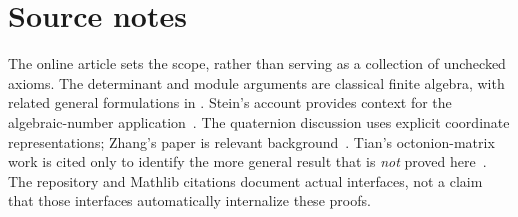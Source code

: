 \documentclass[11pt,letterpaper]{article}
\theoremstyle{remark}
\numberwithin{equation}{section}
\begin{document}
\section*{Source notes}
The online article sets the scope, rather than serving as a collection
of unchecked axioms. The determinant and module arguments are classical
finite algebra, with related general formulations in
\cite{stacks,conrad}. Stein's account provides context for the
algebraic-number application~\cite{stein}. The quaternion discussion
uses explicit coordinate representations; Zhang's paper is relevant
background~\cite{zhang}. Tian's octonion-matrix work is cited only to
identify the more general result that is \emph{not} proved here~\cite{tian}.
The repository and Mathlib citations document actual interfaces, not
a claim that those interfaces automatically internalize these proofs.
\end{document}
